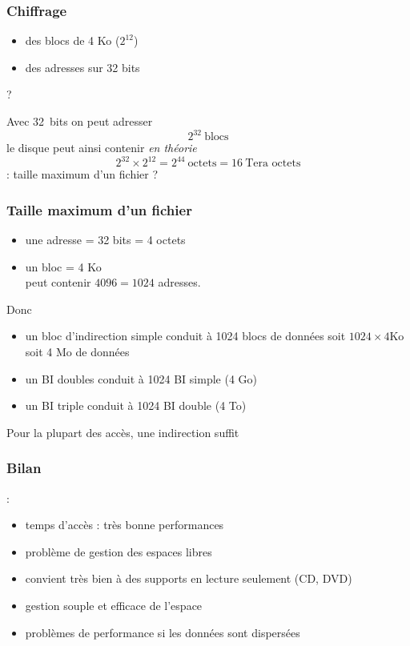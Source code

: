 \begin{frame}
\frametitle{Chiffrage}

\begin{itemize}
\item des blocs de 4 Ko ($2^{12}$)
\item des adresses sur 32 bits
\end{itemize}

 ?
\pause

Avec 32~bits on peut adresser $$ 2^{32} ~\mbox{blocs}$$
\pause
le disque peut ainsi contenir \emph{en théorie} 
$$ 2^{32} \times 2^{12} = 2^{44} ~\mbox{octets} = 16 ~\mbox{Tera octets}$$
\pause
{} : taille maximum d'un fichier ?

\end{frame}

\begin{frame}
\frametitle{Taille maximum d'un fichier}
\begin{itemize}
\item une adresse = 32 bits = 4 octets 
\item un bloc = 4 Ko \\\pause {} peut contenir $4096 = 1024$ adresses.
\end{itemize}
\pause
Donc
\begin{itemize}
\item un \alert{bloc d'indirection simple} conduit à 1024 blocs de données
\pause soit $ 1024 \times 4 \mbox{Ko} $ soit 4 Mo de données
\pause
\item un \alert{BI doubles} conduit à 1024 BI simple (4 Go)
\item un \alert{BI triple} conduit à 1024 BI double (4 To)
\end{itemize}
 Pour la plupart des accès, une indirection suffit
\end{frame}


\begin{frame}
\frametitle{Bilan}
 :
\begin{itemize}
\item temps d'accès : très bonne performances
\item problème de gestion des espaces libres
\item convient très bien à des supports en lecture seulement (CD, DVD)
\end{itemize}

\begin{itemize}
\item gestion souple et efficace de l'espace
\item problèmes de performance si les données sont dispersées
\end{itemize}
\end{frame}


